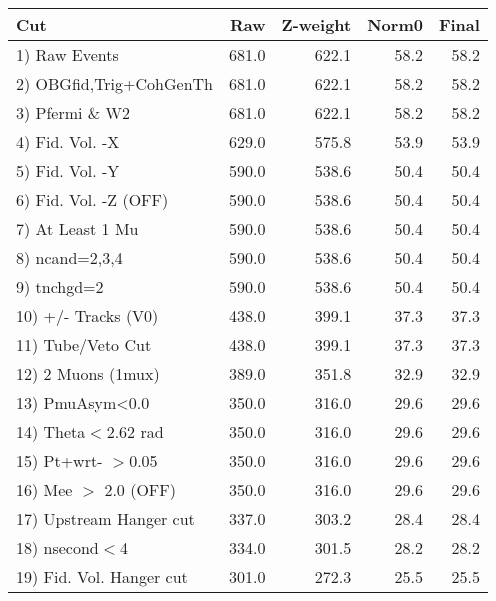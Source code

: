  \begin{table}[h!]\centering
 \begin{tabular}{||l||r|r|r|r||}
 \hline
 \hline
 Cut & Raw & Z-weight & Norm0 & Final \\
 \hline
  1) Raw Events           &       681.0 &       622.1 &        58.2 &        58.2 \\
  2) OBGfid,Trig+CohGenTh &       681.0 &       622.1 &        58.2 &        58.2 \\
  3) Pfermi \& W2         &       681.0 &       622.1 &        58.2 &        58.2 \\
  4) Fid. Vol. -X         &       629.0 &       575.8 &        53.9 &        53.9 \\
  5) Fid. Vol. -Y         &       590.0 &       538.6 &        50.4 &        50.4 \\
  6) Fid. Vol. -Z (OFF)   &       590.0 &       538.6 &        50.4 &        50.4 \\
  7) At Least 1 Mu        &       590.0 &       538.6 &        50.4 &        50.4 \\
  8) ncand=2,3,4          &       590.0 &       538.6 &        50.4 &        50.4 \\
  9) tnchgd=2             &       590.0 &       538.6 &        50.4 &        50.4 \\
 10) +/- Tracks (V0)      &       438.0 &       399.1 &        37.3 &        37.3 \\
 11) Tube/Veto Cut        &       438.0 &       399.1 &        37.3 &        37.3 \\
 12) 2 Muons (1mux)       &       389.0 &       351.8 &        32.9 &        32.9 \\
 13) PmuAsym<0.0          &       350.0 &       316.0 &        29.6 &        29.6 \\
 14) Theta$<$2.62 rad     &       350.0 &       316.0 &        29.6 &        29.6 \\
 15) Pt+wrt- $>$0.05      &       350.0 &       316.0 &        29.6 &        29.6 \\
 16) Mee $>$ 2.0  (OFF)   &       350.0 &       316.0 &        29.6 &        29.6 \\
 17) Upstream Hanger cut  &       337.0 &       303.2 &        28.4 &        28.4 \\
 18) nsecond$<$4          &       334.0 &       301.5 &        28.2 &        28.2 \\
 19) Fid. Vol. Hanger cut &       301.0 &       272.3 &        25.5 &        25.5 \\

\end{tabular}
\end{table}
